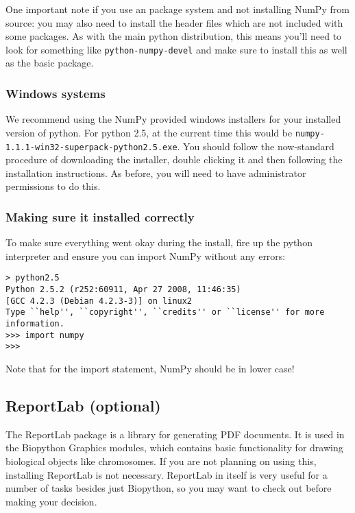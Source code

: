 \documentclass{article}
\begin{document}
One important note if you use an package system and not installing
NumPy from source: you may also need to
install the header files which are not included with some
packages. As with the main python distribution, this means
you'll need to look for something like \verb|python-numpy-devel| 
and make sure to install this as well as the basic package.

\subsubsection{Windows systems}

We recommend using the NumPy provided windows installers for your installed
version of python. For python 2.5, at the current time this would be
\verb|numpy-1.1.1-win32-superpack-python2.5.exe|. You should follow the 
now-standard procedure of downloading the installer, double
clicking it and then following the installation instructions. As before,
you will need to have administrator permissions to do this.

\subsubsection{Making sure it installed correctly}

To make sure everything went okay during the install, fire up the python
interpreter and ensure you can import NumPy without any errors:

\begin{verbatim}
> python2.5
Python 2.5.2 (r252:60911, Apr 27 2008, 11:46:35) 
[GCC 4.2.3 (Debian 4.2.3-3)] on linux2
Type ``help'', ``copyright'', ``credits'' or ``license'' for more information.
>>> import numpy
>>>
\end{verbatim}

Note that for the import statement, NumPy should be in lower case!

\subsection{ReportLab (optional)}

The ReportLab package is a library for generating PDF documents. It is
used in the Biopython Graphics modules, which contains basic
functionality for drawing biological objects like chromosomes. If you
are not planning on using this, installing ReportLab is not necessary.
ReportLab in itself is very useful for a number of tasks besides just
Biopython, so you may want to check out
 before making your decision.
\end{document}
